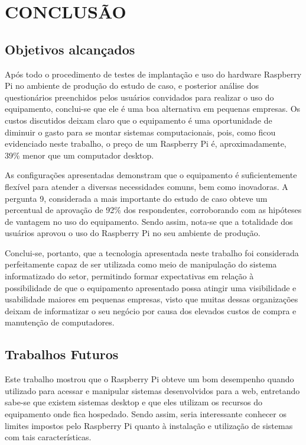 \chapter{CONCLUSÃO}

\section{Objetivos alcançados}

Após todo o procedimento de testes de implantação e uso do hardware Raspberry Pi no ambiente de produção do estudo de caso, e posterior análise dos questionários preenchidos pelos usuários convidados para realizar o uso do equipamento, conclui-se que ele é uma boa alternativa em pequenas empresas.
Os custos discutidos deixam claro que o equipamento é uma oportunidade de diminuir o gasto para se montar sistemas computacionais, pois, como ficou evidenciado neste trabalho, o preço de um Raspberry Pi é, aproximadamente, 39\% menor que um computador desktop.

As configurações apresentadas demonstram que o equipamento é suficientemente flexível para atender a diversas necessidades comuns, bem como inovadoras.
A pergunta 9, considerada a mais importante do estudo de caso obteve um percentual de aprovação de 92\% dos respondentes, corroborando com as hipóteses de vantagem no uso do equipamento. Sendo assim, nota-se que a totalidade dos usuários aprovou o uso do Raspberry Pi no seu ambiente de produção.

Conclui-se, portanto, que a tecnologia apresentada neste trabalho foi considerada perfeitamente capaz de ser utilizada como meio de manipulação do sistema informatizado do setor, permitindo formar expectativas em relação à possibilidade de que o equipamento apresentado possa atingir uma visibilidade e usabilidade maiores em pequenas empresas, visto que muitas dessas organizações deixam de informatizar o seu negócio por causa dos elevados custos de compra e manutenção de computadores.

\section{Trabalhos Futuros}

Este trabalho mostrou que o Raspberry Pi obteve um bom desempenho quando utilizado para acessar e manipular sistemas desenvolvidos para a web, entretando sabe-se que existem sistemas desktop e que eles utilizam os recursos do equipamento onde fica hospedado. Sendo assim, seria interessante conhecer os limites impostos pelo Raspberry Pi quanto à instalação e utilização de sistemas com tais características.